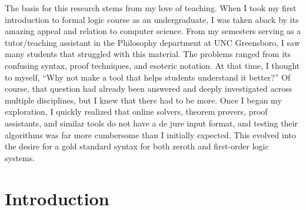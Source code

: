 \documentclass[ms]{uncgdissertationexp2}
\theoremstyle{plain}
\theoremstyle{definition}
\theoremstyle{remark}
\begin{document}
\begin{preface}
	The basis for this research stems from my love of teaching. When I took my first introduction to formal logic course as an undergraduate, I was taken aback by its amazing appeal and relation to computer science. From my semesters serving as a tutor/teaching assistant in the Philosophy department at UNC Greensboro, I saw many students that struggled with this material. The problems ranged from its confusing syntax, proof techniques, and esoteric notation. At that time, I thought to myself, ``Why not make a tool that helps students understand it better?'' Of course, that question had already been answered and deeply investigated across multiple disciplines, but I knew that there had to be more. Once I began my exploration, I quickly realized that online solvers, theorem provers, proof assistants, and similar tools do not have a de jure input format, and testing their algorithms was far more cumbersome than I initially expected. This evolved into the desire for a gold standard syntax for both zeroth and first-order logic systems.
\end{preface}

\tableofcontents 
\listoftables   
\listoffigures   
\doublespacing

\mainmatter %
\chapter{Introduction}
\end{document}
